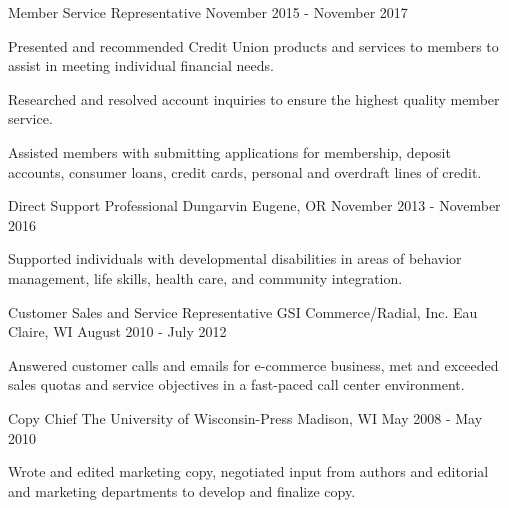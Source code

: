\begin{cventries}
  \cventry
    {Member Service Representative} %
    {} %
    {} %
    {November 2015 - November 2017} %
    {
      \begin{cvitems} %
        \item {Presented and recommended Credit Union products and services to members to assist in meeting individual financial needs.}
        \item {Researched and resolved account inquiries to ensure the highest quality member service.}
        \item {Assisted members with submitting applications for membership, deposit accounts, consumer loans, credit cards, personal and overdraft lines of credit.}
         	\end{cvitems}
    } 
    
    \cventry
    {Direct Support Professional} %
    {Dungarvin} %
    {Eugene, OR} %
    {November 2013 - November 2016} %
    {
      \begin{cvitems} %
        \item {Supported individuals with developmental disabilities in areas of behavior management, life skills, health care, and community integration. }
      \end{cvitems}
    }     
    
    \cventry
    {Customer Sales and Service Representative} %
    {GSI Commerce/Radial, Inc.} %
    {Eau Claire, WI} %
    {August 2010 - July 2012} %
    {
      \begin{cvitems} %
        \item {Answered customer calls and emails for e-commerce business, met and exceeded sales quotas and service objectives in a fast-paced call center environment.}
      \end{cvitems}
    }   
     
    \cventry
    {Copy Chief}
    {The University of Wisconsin-Press}
    {Madison, WI}
    {May 2008 - May 2010}
    {\begin{cvitems}
      \item{Wrote and edited marketing copy, negotiated input from authors and editorial and marketing departments to develop and finalize copy.}
    \end{cvitems}
    }


\end{cventries}

